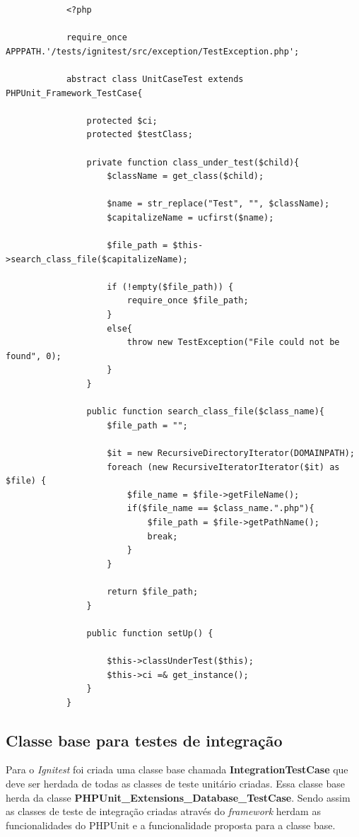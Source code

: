         \begin{lstlisting}
            <?php

            require_once APPPATH.'/tests/ignitest/src/exception/TestException.php';

            abstract class UnitCaseTest extends PHPUnit_Framework_TestCase{

                protected $ci;
                protected $testClass;

                private function class_under_test($child){
                    $className = get_class($child);

                    $name = str_replace("Test", "", $className);
                    $capitalizeName = ucfirst($name);

                    $file_path = $this->search_class_file($capitalizeName);

                    if (!empty($file_path)) {
                        require_once $file_path;
                    }
                    else{
                        throw new TestException("File could not be found", 0);
                    }
                }

                public function search_class_file($class_name){
                    $file_path = "";

                    $it = new RecursiveDirectoryIterator(DOMAINPATH);
                    foreach (new RecursiveIteratorIterator($it) as $file) {
                        $file_name = $file->getFileName();
                        if($file_name == $class_name.".php"){
                            $file_path = $file->getPathName();
                            break; 
                        }
                    }

                    return $file_path;
                }
                
                public function setUp() {   

                    $this->classUnderTest($this);
                    $this->ci =& get_instance();
                }
            }

        \end{lstlisting}

    \subsection{Classe base para testes de integração}

        Para o \textit{Ignitest} foi criada uma classe base chamada \textbf{IntegrationTestCase} que deve ser herdada de todas as classes de teste unitário criadas. 
        Essa classe base herda da classe \textbf{PHPUnit\_Extensions\_Database\_TestCase}. Sendo assim as classes de teste de integração criadas através do \textit{framework} herdam as funcionalidades do PHPUnit e a funcionalidade proposta para a classe base.

